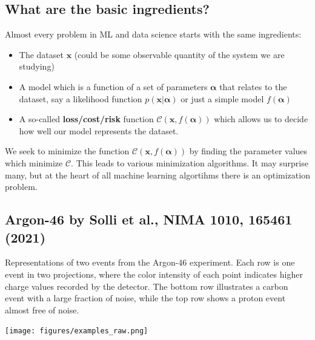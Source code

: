 \documentclass[%
oneside,                 %
final,                   %
10pt]{article}
\begin{document}
\subsection{What are the basic ingredients?}
\begin{block}{}
Almost every problem in ML and data science starts with the same ingredients:
\begin{itemize}
\item The dataset $\mathbf{x}$ (could be some observable quantity of the system we are studying)

\item A model which is a function of a set of parameters $\mathbf{\alpha}$ that relates to the dataset, say a likelihood  function $p(\mathbf{x}\vert \mathbf{\alpha})$ or just a simple model $f(\mathbf{\alpha})$

\item A so-called \textbf{loss/cost/risk} function $\mathcal{C} (\mathbf{x}, f(\mathbf{\alpha}))$ which allows us to decide how well our model represents the dataset. 
\end{itemize}

\noindent
We seek to minimize the function $\mathcal{C} (\mathbf{x}, f(\mathbf{\alpha}))$ by finding the parameter values which minimize $\mathcal{C}$. This leads to  various minimization algorithms. It may surprise many, but at the heart of all machine learning algortihms there is an optimization problem. 
\end{block}

\subsection{Argon-46 by Solli et al., NIMA 1010, 165461 (2021)}

\begin{block}{}
Representations of two events from the
Argon-46 experiment. Each row is one event in two projections,
where the color intensity of each point indicates higher charge values
recorded by the detector. The bottom row illustrates a carbon event with
a large fraction of noise, while the top row shows a proton event
almost free of noise. 
\end{block}

\vspace{6mm}

\centerline{\texttt{[image: figures/examples\_raw.png]}}

\vspace{6mm}
\end{document}
